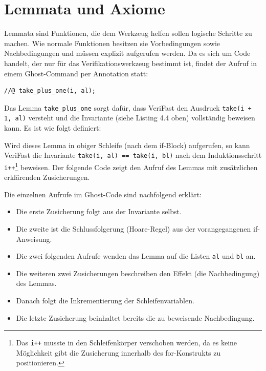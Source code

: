 \section{Lemmata und Axiome}
\label{verifizierung:lemma}

Lemmata sind Funktionen, die dem Werkzeug helfen sollen logische Schritte zu machen. Wie normale
Funktionen besitzen sie Vorbedingungen sowie Nachbedingungen und müssen explizit aufgerufen werden.
Da es sich um Code handelt, der nur für das Verifikationswerkzeug bestimmt ist, findet der Aufruf
in einem Ghost-Command per Annotation statt:

\lstset{frame=none}                      
\begin{lstlisting}
//@ take_plus_one(i, al);
\end{lstlisting}
\lstset{frame=single}    
Das Lemma \lstinline{take_plus_one} sorgt dafür, dass VeriFast den Ausdruck \lstinline{take(i + 1, al)}
versteht und die Invariante (siehe Listing 4.4 oben) vollständig beweisen kann. Es ist wie folgt
definiert:



Wird dieses Lemma in obiger Schleife (nach dem if-Block) aufgerufen, so kann VeriFast
die Invariante \lstinline{take(i, al) == take(i, bl)} nach dem Induktionsschritt \lstinline{i++}\footnote{Das 
\lstinline{i++} musste in den Schleifenkörper verschoben werden, da es keine  Möglichkeit gibt die Zusicherung 
innerhalb des for-Konstrukts zu positionieren.}
beweisen. Der folgende Code zeigt den Aufruf des Lemmas mit zusätzlichen erklärenden Zusicherungen.



Die einzelnen Aufrufe im Ghost-Code sind nachfolgend erklärt:
\begin{itemize}
\item Die erste Zusicherung folgt aus der Invariante selbst.
\item Die zweite ist die Schlussfolgerung (Hoare-Regel) aus der vorangegangenen if-Anweisung.
\item Die zwei folgenden Aufrufe wenden das Lemma auf die Listen \lstinline{al} und \lstinline{bl} an.
\item Die weiteren zwei Zusicherungen beschreiben den Effekt (die Nachbedingung) des Lemmas.
\item Danach folgt die Inkrementierung der Schleifenvariablen.
\item Die letzte Zusicherung beinhaltet bereits die zu beweisende Nachbedingung.
\end{itemize}

